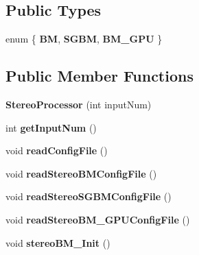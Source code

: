 \subsection*{Public Types}
\begin{DoxyCompactItemize}
\item 
enum \{ {\bfseries BM}, 
{\bfseries S\+G\+BM}, 
{\bfseries B\+M\+\_\+\+G\+PU}
 \}\hypertarget{class_stereo_processor_ad2d7c38c58a749e87183b5d7cd95e5f2}{}\label{class_stereo_processor_ad2d7c38c58a749e87183b5d7cd95e5f2}

\end{DoxyCompactItemize}
\subsection*{Public Member Functions}
\begin{DoxyCompactItemize}
\item 
{\bfseries Stereo\+Processor} (int input\+Num)\hypertarget{class_stereo_processor_ad7943f2a7d76a753bc006240b1fcf0f8}{}\label{class_stereo_processor_ad7943f2a7d76a753bc006240b1fcf0f8}

\item 
int {\bfseries get\+Input\+Num} ()\hypertarget{class_stereo_processor_a70b148471e8f97239a3523f35555664b}{}\label{class_stereo_processor_a70b148471e8f97239a3523f35555664b}

\item 
void {\bfseries read\+Config\+File} ()\hypertarget{class_stereo_processor_aac067ad8f9d37b32125679716e2747af}{}\label{class_stereo_processor_aac067ad8f9d37b32125679716e2747af}

\item 
void {\bfseries read\+Stereo\+B\+M\+Config\+File} ()\hypertarget{class_stereo_processor_ad3b8520e5fac5e91e7753ccb84cc42a5}{}\label{class_stereo_processor_ad3b8520e5fac5e91e7753ccb84cc42a5}

\item 
void {\bfseries read\+Stereo\+S\+G\+B\+M\+Config\+File} ()\hypertarget{class_stereo_processor_a3f1602fd35574e632448ac441795d6d1}{}\label{class_stereo_processor_a3f1602fd35574e632448ac441795d6d1}

\item 
void {\bfseries read\+Stereo\+B\+M\+\_\+\+G\+P\+U\+Config\+File} ()\hypertarget{class_stereo_processor_aae81bd7c15af3392286fcf8291c15839}{}\label{class_stereo_processor_aae81bd7c15af3392286fcf8291c15839}

\item 
void {\bfseries stereo\+B\+M\+\_\+\+Init} ()\hypertarget{class_stereo_processor_a4d3a0da0bc39fe82fcf964859acd7ced}{}\label{class_stereo_processor_a4d3a0da0bc39fe82fcf964859acd7ced}


\end{DoxyCompactItemize}
